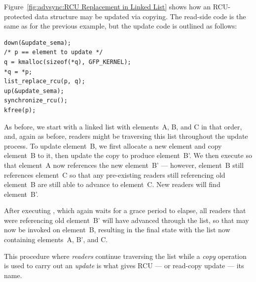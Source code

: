 Figure~\ref{fig:advsync:RCU Replacement in Linked List}
shows how an RCU-protected data structure may be updated via
copying.
The read-side code is the same as for the previous example, but
the update code is outlined as follows:

\vspace{5pt}
\begin{minipage}[t]{\columnwidth}
\begin{verbatim}
down(&update_sema);
/* p == element to update */
q = kmalloc(sizeof(*q), GFP_KERNEL);
*q = *p;
list_replace_rcu(p, q);
up(&update_sema);
synchronize_rcu();
kfree(p);
\end{verbatim}
\end{minipage}
\vspace{5pt}

As before, we start with a linked list with elements~A, B, and C
in that order, and, again as before, readers might be traversing
this list throughout the update process.
To update element~B, we first allocate a new element and copy element~B
to it, then update the copy to produce element~B'.
We then execute  so that element~A now
references the new element~B' --- however, element~B still references
element~C so that any pre-existing readers still referencing old element~B
are still able to advance to element~C.
New readers will find element~B'.

After executing , which again waits for a grace
period to elapse, all readers that were referencing old element~B'
will have advanced through the list, so that  may now
be invoked on element~B, resulting in the final state with the list
now containing elements~A, B', and C.

This procedure where \emph{readers} continue traversing the list
while a \emph{copy} operation is used to carry out an \emph{update}
is what gives RCU --- or read-copy update --- its name.

